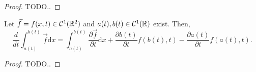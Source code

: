 \begin{proof}
  TODO..
\end{proof}



\begin{thm}
  Let $\vec{f}=f(x,t) \in \mathcal{C}^{1}(\mathbb{R}^2)$ and $a(t),b(t) \in \mathcal{C}^{1}(\mathbb{R})$ exist. Then,
  \[
    \frac{d}{d t} \int_{a(t)}^{b(t)} \vec{f} \mathrm{d} x
    = \int_{a(t)}^{b(t)} \frac{\partial \vec{f}}{\partial t} \mathrm{d} x
    + \frac{\partial b(t)}{\partial t} f(b(t),t) - \frac{\partial a(t)}{\partial t} f(a(t),t).
  \]
\end{thm}

\begin{proof}
  TODO..
\end{proof}
